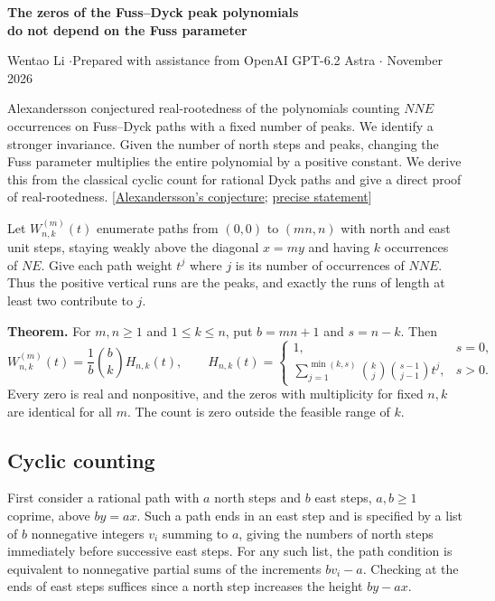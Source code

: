\documentclass[11pt]{article}
\begin{document}
\begin{center}{\Large\bfseries The zeros of the Fuss--Dyck peak polynomials\\ do not depend on the Fuss parameter}\par
\small Wentao Li \enspace$\cdot$\enspace Prepared with assistance from OpenAI GPT-6.2 Astra \enspace$\cdot$ November 2026\end{center}

Alexandersson conjectured real-rootedness of the polynomials counting $NNE$ occurrences on Fuss--Dyck paths with a fixed number of peaks. We identify a stronger invariance. Given the number of north steps and peaks, changing the Fuss parameter multiplies the entire polynomial by a positive constant. We derive this from the classical cyclic count for rational Dyck paths and give a direct proof of real-rootedness. [\href{https://www.symmetricfunctions.com/realRootedCatalan.htm}{Alexandersson's conjecture}; \href{https://www.symmetricfunctions.com/realRootedOpenProblems.htm}{precise statement}]

Let $W^{(m)}_{n,k}(t)$ enumerate paths from $(0,0)$ to $(mn,n)$ with north and east unit steps, staying weakly above the diagonal $x=my$ and having $k$ occurrences of $NE$. Give each path weight $t^j$ where $j$ is its number of occurrences of $NNE$. Thus the positive vertical runs are the peaks, and exactly the runs of length at least two contribute to $j$.

\textbf{Theorem.} For $m,n\ge1$ and $1\le k\le n$, put $b=mn+1$ and $s=n-k$. Then
\[
 W^{(m)}_{n,k}(t)=\frac1b\binom{b}{k}H_{n,k}(t),\qquad
 H_{n,k}(t)=
 \begin{cases}
 1,&s=0,\\
 \displaystyle\sum_{j=1}^{\min(k,s)}\binom{k}{j}\binom{s-1}{j-1}t^j,&s>0 .
 \end{cases}
\]
Every zero is real and nonpositive, and the zeros with multiplicity for fixed $n,k$ are identical for all $m$. The count is zero outside the feasible range of $k$.

\subsection*{Cyclic counting}
First consider a rational path with $a$ north steps and $b$ east steps, $a,b\ge1$ coprime, above $by=ax$. Such a path ends in an east step and is specified by a list of $b$ nonnegative integers $v_i$ summing to $a$, giving the numbers of north steps immediately before successive east steps. For any such list, the path condition is equivalent to nonnegative partial sums of the increments $bv_i-a$. Checking at the ends of east steps suffices since a north step increases the height $by-ax$.
\end{document}

